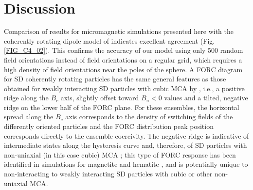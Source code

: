 \section{Discussion}
Comparison of results for micromagnetic simulations presented here with the coherently rotating dipole model of \citet{ValdezGrijalva2017} indicates excellent agreement (Fig. \ref{FIG_C4_02}). This confirms the accuracy of our model using only 500 random field orientations instead of field orientations on a regular grid, which requires a high density of field orientations near the poles of the sphere. A FORC diagram for SD coherently rotating particles has the same general features as those obtained for weakly interacting SD particles with cubic MCA by \citet{Harrison2014}, i.e., a positive ridge along the $B_c$ axis, slightly offset toward $B_u<0$ values and a tilted, negative ridge on the lower half of the FORC plane. For these ensembles, the horizontal spread along the $B_c$ axis corresponds to the density of switching fields of the differently oriented particles and the FORC distribution peak position corresponds directly to the ensemble coercivity. The negative ridge is indicative of intermediate states along the hysteresis curve and, therefore, of SD particles with non-uniaxial (in this case cubic) MCA \citep{ValdezGrijalva2017}; this type of FORC response has been identified in simulations for magnetite \citep{Harrison2014} and hematite \citep{Harrison2017}, and is potentially unique to non-interacting to weakly interacting SD particles with cubic or other non-uniaxial MCA.\par

